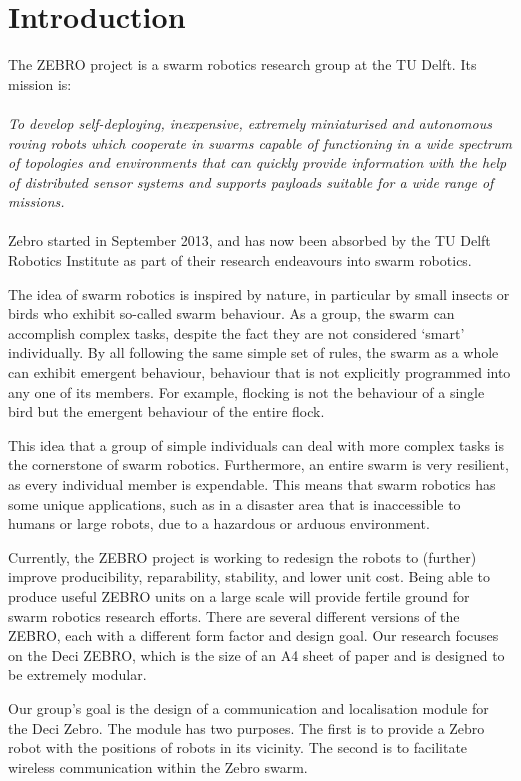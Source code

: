 \chapter{Introduction}

The ZEBRO project is a swarm robotics research group at the TU Delft.
Its mission is:
\\\\
\emph{To develop self-deploying, inexpensive, extremely miniaturised and autonomous roving robots which cooperate in swarms capable of functioning in a wide spectrum of topologies and environments that can quickly provide information with the help of distributed sensor systems and supports payloads suitable for a wide range of missions.}
\\\\
Zebro started in September 2013, and has now been absorbed by the TU Delft Robotics Institute as part of their research endeavours into swarm robotics.

The idea of swarm robotics is inspired by nature, in particular by small insects or birds who exhibit so-called swarm behaviour.
As a group, the swarm can accomplish complex tasks, despite the fact they are not considered `smart' individually.
By all following the same simple set of rules, the swarm as a whole can exhibit emergent behaviour, behaviour that is not explicitly programmed into any one of its members.
For example, flocking is not the behaviour of a single bird but the emergent behaviour of the entire flock.

This idea that a group of simple individuals can deal with more complex tasks is the cornerstone of swarm robotics.
Furthermore, an entire swarm is very resilient, as every individual member is expendable.
This means that swarm robotics has some unique applications, such as in a disaster area that is inaccessible to humans or large robots, due to a hazardous or arduous environment.

Currently, the ZEBRO project is working to redesign the robots to (further) improve producibility, reparability, stability, and lower unit cost.
Being able to produce useful ZEBRO units on a large scale will provide fertile ground for swarm robotics research efforts.
There are several different versions of the ZEBRO, each with a different form factor and design goal.
Our research focuses on the Deci ZEBRO, which is the size of an A4 sheet of paper and is designed to be extremely modular.

Our group's goal is the design of a communication and localisation module for the Deci Zebro.
The module has two purposes.
The first is to provide a Zebro robot with the positions of robots in its vicinity.
The second is to facilitate wireless communication within the Zebro swarm.


